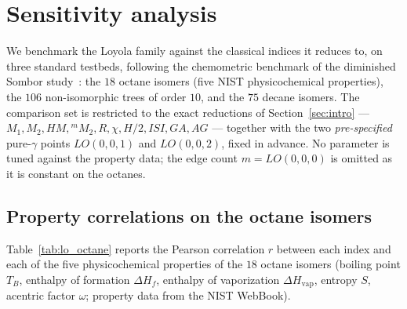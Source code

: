 \documentclass[a5paper, 10pt]{article}
\theoremstyle{plain}
\theoremstyle{remark}
\theoremstyle{definition}
\begin{document}
\section{Sensitivity analysis}\label{sec:sensitivity}

We benchmark the Loyola family against the classical indices it
reduces to, on three standard testbeds, following the chemometric
benchmark of the diminished Sombor
study~\cite{MovahediGutmanRedzepovicFurtula2026}: the $18$ octane
isomers (five NIST physicochemical properties), the $106$
non-isomorphic trees of order $10$, and the $75$ decane isomers. The comparison set
is restricted to the exact reductions of Section~\ref{sec:intro} ---
$M_1, M_2, HM, {}^{m}\!M_2, R, \chi, H/2, ISI, GA, AG$ --- together
with the two \emph{pre-specified} pure-$\gamma$ points $LO(0, 0, 1)$
and $LO(0, 0, 2)$, fixed in advance. No parameter is tuned against
the property data; the edge count $m = LO(0, 0, 0)$ is omitted as it
is constant on the octanes.

\subsection{Property correlations on the octane isomers}\label{sec:octanes}

Table~\ref{tab:lo_octane} reports the Pearson correlation $r$ between
each index and each of the five physicochemical properties of the
$18$ octane isomers (boiling point $T_B$, enthalpy of formation
$\Delta H_f$, enthalpy of vaporization $\Delta H_{\mathrm{vap}}$,
entropy $S$, acentric factor $\omega$; property data from the NIST
WebBook).
\end{document}
